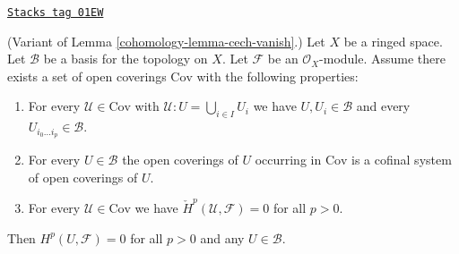 \begin{lemma}
\label{cohomology-lemma-cech-vanish-basis}
\href{https://stacks.math.columbia.edu/tag/01EW}{\texttt{Stacks tag 01EW}}

(Variant of Lemma \ref{cohomology-lemma-cech-vanish}.)
Let $X$ be a ringed space.
Let $\mathcal{B}$ be a basis for the topology on $X$.
Let $\mathcal{F}$ be an $\mathcal{O}_X$-module.
Assume there exists a set of open coverings $\text{Cov}$
with the following properties:
\begin{enumerate}
\item For every $\mathcal{U} \in \text{Cov}$
with $\mathcal{U} : U = \bigcup_{i \in I} U_i$ we have
$U, U_i \in \mathcal{B}$ and every $U_{i_0 \ldots i_p} \in \mathcal{B}$.
\item For every $U \in \mathcal{B}$ the open coverings of $U$
occurring in $\text{Cov}$ is a cofinal system of open coverings
of $U$.
\item For every $\mathcal{U} \in \text{Cov}$ we have
$\check{H}^p(\mathcal{U}, \mathcal{F}) = 0$ for all $p > 0$.
\end{enumerate}
Then $H^p(U, \mathcal{F}) = 0$ for all $p > 0$ and any $U \in \mathcal{B}$.
\end{lemma}

